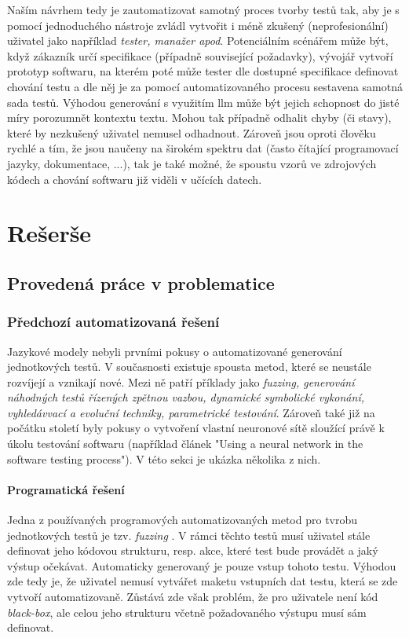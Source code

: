 \documentclass[czech, ma, kiv, he, iso690numb, pdf, viewonly]{fasthesis}
\begin{document}
    Naším návrhem tedy je zautomatizovat samotný proces tvorby testů tak, aby je s pomocí jednoduchého nástroje zvládl vytvořit i méně zkušený (neprofesionální) uživatel jako například \textit{tester, manažer apod}. Potenciálním scénářem může být, když zákazník určí specifikace (případně související požadavky), vývojář vytvoří prototyp softwaru, na kterém poté může tester dle dostupné specifikace definovat chování testu a dle něj je za pomocí automatizovaného procesu sestavena samotná sada testů. Výhodou generování s využitím \Gls{llm} může být jejich schopnost do jisté míry porozumnět kontextu textu. Mohou tak případně odhalit chyby (či stavy), které by nezkušený uživatel nemusel odhadnout. Zároveň jsou oproti člověku rychlé a tím, že jsou naučeny na širokém spektru dat (často čítající programovací jazyky, dokumentace, ...), tak je také možné, že spoustu vzorů ve zdrojových kódech a chování softwaru již viděli v učících datech.

\chapter{Rešerše} \label{sec:research}

    \section{Provedená práce v problematice} \label{sec:previouswork}
        \subsection{Předchozí automatizovaná řešení}
        Jazykové modely nebyli prvními pokusy o automatizované generování jednotkových testů. V současnosti existuje spousta metod, které se neustále rozvíjejí a vznikají nové. Mezi ně patří příklady jako \textit{fuzzing, generování náhodných testů řízených zpětnou vazbou, dynamické symbolické vykonání, vyhledávvací a evoluční techniky, parametrické testování}. Zároveň také již na počátku století byly pokusy o vytvoření vlastní neuronové sítě sloužící právě k úkolu testování softwaru (například článek "Using a neural network in the software testing process"). \cite{Vanmali2002UsingAN} V této sekci je ukázka několika z nich. 

        \subsubsection{Programatická řešení}
        Jedna z používaných programových automatizovaných metod pro tvrobu jednotkových testů je tzv. \textit{fuzzing} \cite{manes2019art}. V rámci těchto testů musí uživatel stále definovat jeho kódovou strukturu, resp. akce, které test bude provádět a jaký výstup očekávat. Automaticky generovaný je pouze vstup tohoto testu. Výhodou zde tedy je, že uživatel nemusí vytvářet maketu vstupních dat testu, která se zde vytvoří automatizovaně. Zůstává zde však problém, že pro uživatele není kód \emph{black-box}, ale celou jeho strukturu včetně požadovaného výstupu musí sám definovat. \cite{fuzzing}
\end{document}
